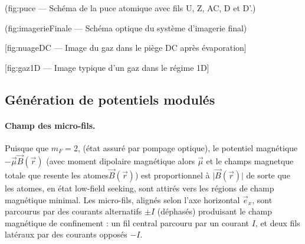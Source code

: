 \begin{center}
	({fig:puce} — Schéma de la puce atomique avec fils U, Z, AC, D et D'.)
\end{center}
\begin{center}
	({fig:imagerieFinale} — Schéma optique du système d’imagerie final)
\end{center}
\begin{center}
	[{fig:nuageDC} — Image du gaz dans le piège DC après évaporation]
\end{center}
\begin{center}
	[{fig:gaz1D} — Image typique d’un gaz dans le régime 1D]
\end{center}



\subsection{Génération de potentiels modulés}

\paragraph{Champ des micro-fils.}
Puisque que $m_F = 2 $, (état assuré par pompage optique), le potentiel magnétique $-\vec{\mu} \vec{B}(\vec{r}) $ (avec moment dipolaire magnétique alors $\vec{\mu}$ et le champs magnetque totale que resente les atomes$\vec{B}(\vec{r})$) est proportionnel à $\vert \vec{B}(\vec{r}) \vert$  de sorte que les atomes, en état low-field seeking, sont attirés vers les régions de champ magnétique minimal. Les micro-fils, alignés selon l’axe horizontal $\vec{e}_x$, sont parcourus par des courants alternatifs $\pm I$ (déphasés) produisant le champ magnétique de confinement : un fil central parcouru par un courant \( I \), et deux fils latéraux par des courants opposés \(-I\). 

